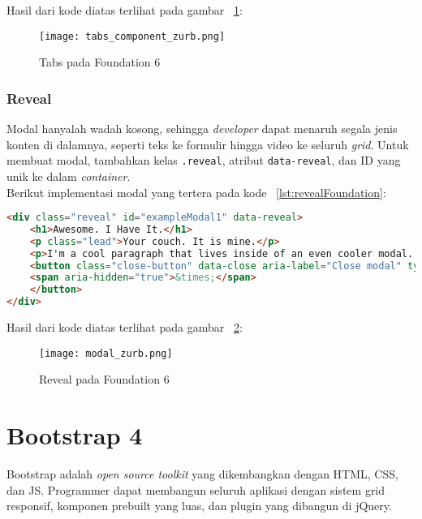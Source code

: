 \noindent Hasil dari kode diatas terlihat pada gambar ~\ref{fig:tabsFoundation}:
\begin{figure} [H]
	\centering  
	\texttt{[image: tabs\_component\_zurb.png]}  
	\caption{Tabs pada Foundation 6}
	\label{fig:tabsFoundation}
\end{figure}

\subsubsection{Reveal}
Modal hanyalah wadah kosong, sehingga \textit{developer} dapat menaruh segala jenis konten di dalamnya, seperti teks ke formulir hingga video ke seluruh \textit{grid}.
Untuk membuat modal, tambahkan kelas \texttt{.reveal}, atribut \texttt{data-reveal}, dan ID yang unik ke dalam \textit{container}.
\\
\noindent Berikut implementasi modal yang tertera pada kode ~\ref{lst:revealFoundation}:

\begin{lstlisting}[style=customhtml, language=HTML,  basicstyle=\ttfamily, frame=single, columns=fullflexible, keepspaces=true, breaklines=true, showstringspaces=false, label={lst:revealFoundation}, caption=Reveal pada foundation 6.]  
<div class="reveal" id="exampleModal1" data-reveal>
	<h1>Awesome. I Have It.</h1>
	<p class="lead">Your couch. It is mine.</p>
	<p>I'm a cool paragraph that lives inside of an even cooler modal. Wins!</p>
	<button class="close-button" data-close aria-label="Close modal" type="button">
	<span aria-hidden="true">&times;</span>
	</button>
</div>
\end{lstlisting} 

\noindent Hasil dari kode diatas terlihat pada gambar ~\ref{fig:revealFoundation}:
\begin{figure} [H]
	\centering  
	\texttt{[image: modal\_zurb.png]}  
	\caption{Reveal pada Foundation 6}
	\label{fig:revealFoundation}
\end{figure}

\section{Bootstrap 4}
Bootstrap adalah \textit{open source toolkit} yang dikembangkan dengan HTML, CSS, dan JS. Programmer dapat membangun seluruh aplikasi dengan sistem grid responsif, komponen prebuilt yang luas, dan plugin yang dibangun di jQuery. \cite{bootstrap:19}

